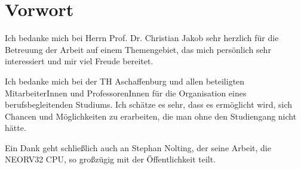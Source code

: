 \chapter*{Vorwort}
\thispagestyle{empty}

Ich bedanke mich bei Herrn Prof. Dr. Christian Jakob sehr herzlich für die Betreuung der Arbeit auf einem Themengebiet, das mich persönlich sehr interessiert und mir viel Freude bereitet.

Ich bedanke mich bei der TH Aschaffenburg und allen beteiligten MitarbeiterInnen und ProfessorenInnen für die Organisation eines berufsbegleitenden Studiums. Ich schätze es sehr, dass es ermöglicht wird, sich Chancen und Möglichkeiten zu erarbeiten, die man ohne den Studiengang nicht hätte.

Ein Dank geht schließlich auch an Stephan Nolting, der seine Arbeit, die NEORV32 CPU, so großzügig mit der Öffentlichkeit teilt.





